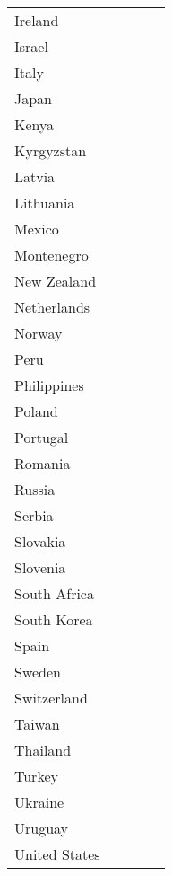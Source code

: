 \documentclass[12pt, titlepage]{article}
\begin{document}
\begin{center}
\begin{longtable}{lcccc}
		Ireland&&&&\\
		Israel&&&&\\
		Italy&&&&\\
		Japan&&&&\\
		Kenya&&&&\\
		Kyrgyzstan&&&&\\
		Latvia&&&&\\
		Lithuania&&&&\\
		Mexico&&&&\\
		Montenegro&&&&\\
		New Zealand&&&&\\
		Netherlands&&&&\\
		Norway&&&&\\
		Peru&&&&\\
		Philippines&&&&\\
		Poland&&&&\\
		Portugal&&&&\\
		Romania&&&&\\
		Russia&&&&\\
		Serbia&&&&\\
		Slovakia&&&&\\
		Slovenia&&&&\\
		South Africa&&&&\\
		South Korea&&&&\\
		Spain&&&&\\
		Sweden&&&&\\
		Switzerland&&&&\\
		Taiwan&&&&\\
		Thailand&&&&\\
		Turkey&&&&\\
		Ukraine&&&&\\
		Uruguay&&&&\\
		United States&&&&\\
		\hline
		
	\end{longtable}
\end{center}
\end{document}
